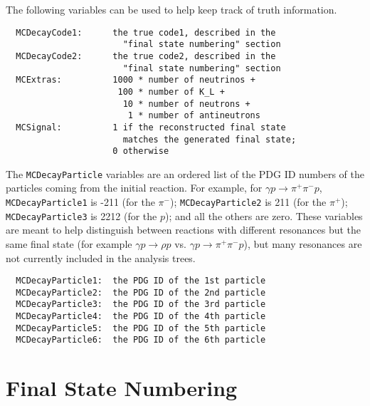 \documentclass[11pt]{article}
\begin{document}
The following variables can be used to help keep track of truth information.

\begin{verbatim}
  MCDecayCode1:      the true code1, described in the
                       "final state numbering" section
  MCDecayCode2:      the true code2, described in the
                       "final state numbering" section
  MCExtras:          1000 * number of neutrinos +
                      100 * number of K_L +
                       10 * number of neutrons +
                        1 * number of antineutrons
  MCSignal:          1 if the reconstructed final state
                       matches the generated final state;
                     0 otherwise
\end{verbatim}

The {\tt MCDecayParticle} variables are an ordered list of the PDG ID numbers of the particles coming from the initial reaction.
For example, for $\gamma p \to \pi^+ \pi^- p$,
{\tt MCDecayParticle1} is -211 (for the $\pi^-$);
{\tt MCDecayParticle2} is 211 (for the $\pi^+$);
{\tt MCDecayParticle3} is 2212 (for the $p$);
and all the others are zero.
These variables are meant to help distinguish between reactions with different resonances but the same final state (for example $\gamma p \to \rho p$ vs. $\gamma p \to \pi^+ \pi^- p$), but many resonances are not currently included in the analysis trees.

\begin{verbatim}
  MCDecayParticle1:  the PDG ID of the 1st particle
  MCDecayParticle2:  the PDG ID of the 2nd particle
  MCDecayParticle3:  the PDG ID of the 3rd particle
  MCDecayParticle4:  the PDG ID of the 4th particle
  MCDecayParticle5:  the PDG ID of the 5th particle
  MCDecayParticle6:  the PDG ID of the 6th particle
\end{verbatim}

\section{Final State Numbering}
\label{sec:numbering}
\end{document}
